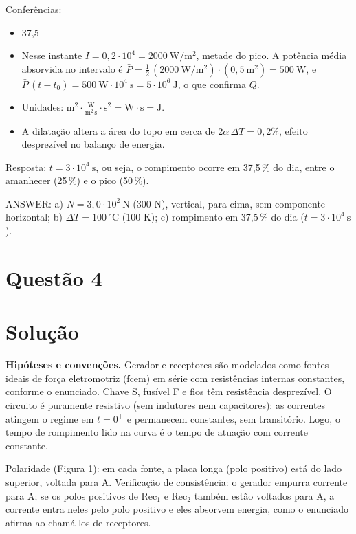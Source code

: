 \documentclass{article}%
\begin{document}
Conferências:
\begin{itemize}
\item 37,5 %
\item Nesse instante $I = 0{,}2\cdot 10^{4} = 2000\ \mathrm{W/m^2}$, metade do pico. A potência média absorvida no intervalo é $\bar P = \tfrac{1}{2}\,(2000\ \mathrm{W/m^2})\cdot(0{,}5\ \mathrm{m^2}) = 500\ \mathrm{W}$, e $\bar P\,(t-t_0) = 500\ \mathrm{W}\cdot 10^{4}\ \mathrm{s} = 5\cdot 10^{6}\ \mathrm{J}$, o que confirma $Q$.
\item Unidades: $\mathrm{m^2}\cdot\mathrm{\frac{W}{m^2\,s}}\cdot\mathrm{s^2} = \mathrm{W\cdot s} = \mathrm{J}$.
\item A dilatação altera a área do topo em cerca de $2\alpha\,\Delta T = 0{,}2\%$, efeito desprezível no balanço de energia.
\end{itemize}

Resposta: $t = 3\cdot 10^{4}\ \mathrm{s}$, ou seja, o rompimento ocorre em 37,5\,\% do dia, entre o amanhecer (25\,\%) e o pico (50\,\%).

ANSWER: a) $N = 3{,}0\cdot 10^{2}\ \mathrm{N}$ (300 N), vertical, para cima, sem componente horizontal; b) $\Delta T = 100\ ^{\circ}\mathrm{C}$ (100 K); c) rompimento em 37,5\,\% do dia ($t = 3\cdot 10^{4}\ \mathrm{s}$).%
\newpage%
\section*{Questão 4}

\section*{Solução}

\textbf{Hipóteses e convenções.} Gerador e receptores são modelados como fontes ideais de força eletromotriz (fcem) em série com resistências internas constantes, conforme o enunciado. Chave S, fusível F e fios têm resistência desprezível. O circuito é puramente resistivo (sem indutores nem capacitores): as correntes atingem o regime em $t = 0^+$ e permanecem constantes, sem transitório. Logo, o tempo de rompimento lido na curva é o tempo de atuação com corrente constante.

Polaridade (Figura 1): em cada fonte, a placa longa (polo positivo) está do lado superior, voltada para A. Verificação de consistência: o gerador empurra corrente para A; se os polos positivos de Rec$_1$ e Rec$_2$ também estão voltados para A, a corrente entra neles pelo polo positivo e eles absorvem energia, como o enunciado afirma ao chamá-los de receptores.
\end{document}
